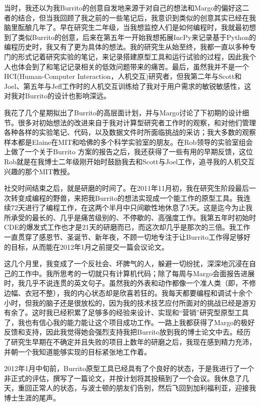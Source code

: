 \documentclass[12pt,UTF8,nofonts]{book}
\begin{document}
当时，我还以为我Burrito的创意自发地来源于对自己的想法和Margo的偏好这二者的结合，但当我回顾了我之前的一些笔记后，我意识到类似的创意其实已经在我脑里酝酿几年了。早在研究生二年级，当我想监控人们是如何编程时，我就最初想到了类似Burrito的创意，后来在第五年一开始我想拓展IncPy来记录基于Python的编程历史时，我又有了更为具体的想法。我的研究生从始至终，我都一直以多种专门的形式记着研究实验的笔记，来记录搭建原型工具和运行试验的过程，因此我个人也体会到了和笔记记录相关的低效问题带来的痛苦。最后，虽然我并不是一个HCI(Human-Computer Interaction，人机交互)研究者，但我第二年与Scott和Joel、第五年与Jeff工作时的人机交互训练给了我对于用户需求的敏锐敏感性，这对我对Burrito的设计也影响深远。

我花了几个星期拟出了Burrito的高层面计划，并与Margo讨论了下初期的设计细节。很多对初始想法的改进来自于我对计算型研究者工作时的观察，和对他们管理各种各样的实验笔记、代码，以及数据文件时所面临挑战的采访；我大多数的观察样本都是Elaine在MIT和哈佛的多个科学实验室的朋友。在Rob领导的实验室组会上做了一个关于Burrito 方案的报告之后，我还获得了一些有用的早期反馈，这位Rob就是在我博士二年级刚开始时鼓励我去和Scott与Joel工作，追寻我的人机交互兴趣的那个MIT教授。

\breakline

社交时间结束之后，就是研磨的时间了。在2011年11月初，我在研究生阶段最后一次转变成编程的野兽，来把我Burrito的想法实现成一个能工作的原型工具。我连续72天进行了编程工作，在这两个半月中只间歇性地休息了5天。这是迄今为止我所承受的最长的、几乎是痛苦级别的、不停歇的、高强度工作。我第五年时初始时CDE的爆发式工作也才是21天的研磨而已，而这次却几乎是那次的三倍。我工作一直贯穿了感恩节、圣诞节、新年夜，不顾一切地专注于让Burrito工作得足够好的目标，从而能在2012年1月之前提交一篇会议论文。

这几个月里，我变成了一个反社会、坏脾气的人，躲避一切纷扰，深深地沉浸在自己的工作中。我所思考的一切就只有计算机代码；除了每周与Margo会面报告进展时，我几乎不说连贯的英文句子。虽然我的外表和动作都像一个准人类（即，不修边幅、衣冠不整），我的内心状态却是欣喜若狂的。我每天都要编程和调试十余个小时，但我的脑子还是很放松的，因为我的技术技艺应付所面对的挑战已经是游刃有余了。这时我已经积累了足够多的经验来设计、实现和“营销”研究型原型工具了，我也有信心我的能力能让这个项目成功工作。一路上我都获得了Margo的极好反馈和支持，因此我觉得她会强烈支持我把Burrito放到我的博士论文中去。经历了研究生早期在不确定并且失败的项目上数年的研磨之后，我现在感到精力充沛，并朝一个我知道能够实现的目标紧张地工作着。

2012年1月中旬前，Burrito原型工具已经具有了个良好的状态，于是我进行了一个非正式的评估，撰写了一篇论文，并按计划将其投稿到了一个会议。我休息了几天，重回正常人的状态，与波士顿的朋友们告别，然后飞回到加利福利亚，迎接我博士生涯的尾声。
\end{document}
